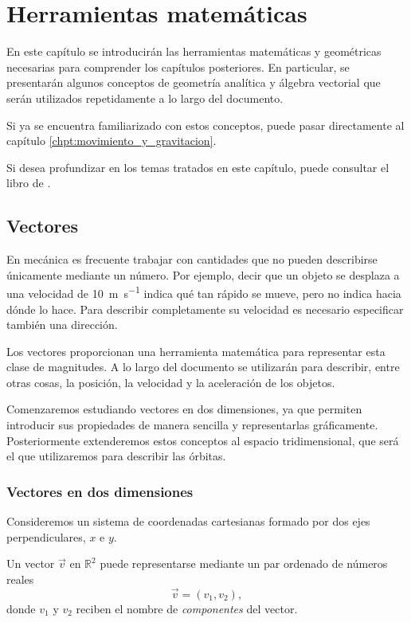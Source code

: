 \chapter{Herramientas matemáticas}

En este capítulo se introducirán las herramientas matemáticas y geométricas necesarias para comprender los capítulos posteriores. En particular, se presentarán algunos conceptos de geometría analítica y álgebra vectorial que serán utilizados repetidamente a lo largo del documento.

Si ya se encuentra familiarizado con estos conceptos, puede pasar directamente al capítulo \ref{chpt:movimiento_y_gravitacion}.

Si desea profundizar en los temas tratados en este capítulo, puede consultar el libro de \textcite{geometriaraichman}.

\section{Vectores}

En mecánica es frecuente trabajar con cantidades que no pueden describirse únicamente mediante un número. Por ejemplo, decir que un objeto se desplaza a una velocidad de \qty{10}{\meter\per\second} indica qué tan rápido se mueve, pero no indica hacia dónde lo hace. Para describir completamente su velocidad es necesario especificar también una dirección.

Los vectores proporcionan una herramienta matemática para representar esta clase de magnitudes. A lo largo del documento se utilizarán para describir, entre otras cosas, la posición, la velocidad y la aceleración de los objetos. 

Comenzaremos estudiando vectores en dos dimensiones, ya que permiten introducir sus propiedades de manera sencilla y representarlas gráficamente. Posteriormente extenderemos estos conceptos al espacio tridimensional, que será el que utilizaremos para describir las órbitas.

\subsection{Vectores en dos dimensiones}

Consideremos un sistema de coordenadas cartesianas formado por dos ejes perpendiculares, \(x\) e \(y\).

\begin{definition}\label{def:vector_r2}
  Un vector \(\vec{v}\) en \(\mathbb{R}^2\) puede representarse mediante un par   ordenado de números reales
  \[
    \vec{v}=(v_1,v_2),
  \]
  donde \(v_1\) y \(v_2\) reciben el nombre de \emph{componentes} del vector.
\end{definition}

